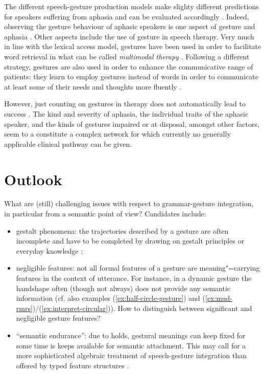 \documentclass[output=paper]{langsci/langscibook}
\begin{document}
The different speech-gesture production models make slighty different predictions for speakers suffering from aphasia and can be evaluated accordingly \citep{deRuiter:deBeer:2013}.
%
Indeed, observing the gesture behaviour of aphasic speakers is one aspect of gesture and aphasia \citep{Jakob:Bartmann:Goldenberg:Ziegler:Hogrefe:2011,Kong:Law:Chak:2017,Sekine:Rose:2013}.
%
Other aspects include the use of gesture in speech therapy. 
%
Very much in line with the lexical access model, gestures have been used in order to facilitate word retrieval in what can be called \emph{multimodal therapy}  \citet{Rose:2006}.
%
Following a different strategy, gestures are also used in order to enhance the communicative range of patients: they learn to employ gestures instead of words in order to communicate at least some of their needs and thoughts more fluently \citep{Cubelli:Trentini:Montagna:1991,Caute:et:al:2013}.

However, just counting on gestures in therapy does not automatically lead to success \citep{Auer:Bauer:2011}. 
%
The kind and severity of aphasia, the individual traits of the aphasic speaker, and the kinds of gestures impaired or at disposal, amongst other factors, seem to a constitute a complex network for which currently no generally applicable clinical pathway can be given.




\section{Outlook}
\label{sec:outlook}

What are (still) challenging issues with respect to grammar-gesture integration, in particular from a semantic point of view? Candidates include:

\begin{itemize}
\item gestalt phenomena: the trajectories described by a gesture are often incomplete and have to be completed by drawing on gestalt principles or everyday knowledge \citep{Luecking:2016};
\item negligible features: not all formal features of a gesture are meaning"=carrying features in the context of utterance. For instance, in a dynamic gesture the handshape often (though not always) does not provide any semantic information (cf. also examples (\ref{ex:half-circle-gesture}) and (\ref{ex:mud-rmrs})/(\ref{ex:interpret-circular})). How to distinguish between significant and negligible gesture features?
\item \enquote{semantic endurance}: due to holds, gestural meanings can keep fixed for some time is keeps available for semantic attachment. This may call for a more sophisticated algebraic treatment of speech-gesture integration than offered by typed feature structures \citep{Rieser:2015}.
\end{itemize}
\end{document}
